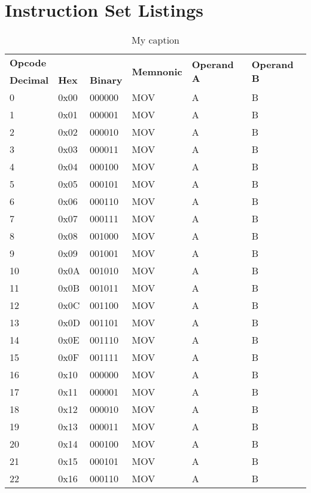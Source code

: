 \documentclass[oneside, a4paper]{memoir}
\begin{document}
\chapter{Instruction Set Listings}
\begin{table}[]
\centering
\caption{My caption}
\label{my-label}
\begin{tabular}{|l|l|l|l|l|l|}
\hline
\multicolumn{3}{|l|}{\textbf{Opcode}} & \multirow{2}{*}{\textbf{Memnonic}} & \multirow{2}{*}{\textbf{Operand A}} & \multirow{2}{*}{\textbf{Operand B}} \\ \cline{1-3}
\textbf{Decimal} & \textbf{Hex} & \textbf{Binary} &  &  &  \\ \hline
0  & 0x00 & 000000 & MOV   & A & B \\ \hline
1  & 0x01 & 000001 & MOV   & A & B \\ \hline
2  & 0x02 & 000010 & MOV   & A & B \\ \hline
3  & 0x03 & 000011 & MOV   & A & B \\ \hline
4  & 0x04 & 000100 & MOV   & A & B \\ \hline
5  & 0x05 & 000101 & MOV   & A & B \\ \hline
6  & 0x06 & 000110 & MOV   & A & B \\ \hline
7  & 0x07 & 000111 & MOV   & A & B \\ \hline
8  & 0x08 & 001000 & MOV   & A & B \\ \hline
9  & 0x09 & 001001 & MOV   & A & B \\ \hline
10 & 0x0A & 001010 & MOV   & A & B \\ \hline
11 & 0x0B & 001011 & MOV   & A & B \\ \hline
12 & 0x0C & 001100 & MOV   & A & B \\ \hline
13 & 0x0D & 001101 & MOV   & A & B \\ \hline
14 & 0x0E & 001110 & MOV  & A & B \\ \hline
15 & 0x0F & 001111 & MOV  & A & B \\ \hline
16 & 0x10 & 000000 & MOV  & A & B \\ \hline
17 & 0x11 & 000001 & MOV  & A & B \\ \hline
18 & 0x12 & 000010 & MOV  & A & B \\ \hline
19 & 0x13 & 000011 & MOV  & A & B \\ \hline
20 & 0x14 & 000100 & MOV  & A & B \\ \hline
21 & 0x15 & 000101 & MOV  & A & B \\ \hline
22 & 0x16 & 000110 & MOV  & A & B \\ \hline

\end{tabular}
\end{table}
\end{document}
